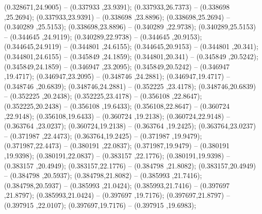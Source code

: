  (0.328671,24.9005) -- (0.337933 ,23.9391);
 (0.337933,26.7373) -- (0.338698 ,25.2694);
 (0.337933,23.9391) -- (0.338698 ,23.8896);
 (0.338698,25.2694) -- (0.340289 ,25.5153);
 (0.338698,23.8896) -- (0.340289 ,22.9738);
 (0.340289,25.5153) -- (0.344645 ,24.9119);
 (0.340289,22.9738) -- (0.344645 ,20.9153);
 (0.344645,24.9119) -- (0.344801 ,24.6155);
 (0.344645,20.9153) -- (0.344801 ,20.341);
 (0.344801,24.6155) -- (0.345849 ,24.1859);
 (0.344801,20.341) -- (0.345849 ,20.5242);
 (0.345849,24.1859) -- (0.346947 ,23.2095);
 (0.345849,20.5242) -- (0.346947 ,19.4717);
 (0.346947,23.2095) -- (0.348746 ,24.2881);
 (0.346947,19.4717) -- (0.348746 ,20.6839);
 (0.348746,24.2881) -- (0.352225 ,23.4178);
 (0.348746,20.6839) -- (0.352225 ,20.2438);
 (0.352225,23.4178) -- (0.356108 ,22.8647);
 (0.352225,20.2438) -- (0.356108 ,19.6433);
 (0.356108,22.8647) -- (0.360724 ,22.9148);
 (0.356108,19.6433) -- (0.360724 ,19.2138);
 (0.360724,22.9148) -- (0.363764 ,23.0237);
 (0.360724,19.2138) -- (0.363764 ,19.2425);
 (0.363764,23.0237) -- (0.371987 ,22.4473);
 (0.363764,19.2425) -- (0.371987 ,19.9479);
 (0.371987,22.4473) -- (0.380191 ,22.0837);
 (0.371987,19.9479) -- (0.380191 ,19.9398);
 (0.380191,22.0837) -- (0.383157 ,22.1776);
 (0.380191,19.9398) -- (0.383157 ,20.4949);
 (0.383157,22.1776) -- (0.384798 ,21.8082);
 (0.383157,20.4949) -- (0.384798 ,20.5937);
 (0.384798,21.8082) -- (0.385993 ,21.7416);
 (0.384798,20.5937) -- (0.385993 ,21.0424);
 (0.385993,21.7416) -- (0.397697 ,21.8797);
 (0.385993,21.0424) -- (0.397697 ,19.7176);
 (0.397697,21.8797) -- (0.397915 ,22.0107);
 (0.397697,19.7176) -- (0.397915 ,19.6983);
